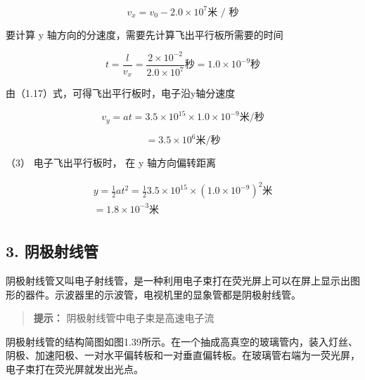 \[
v_{x} = v_{0} - 2.0 \times 10^{7} \text{米 / 秒}
\]

要计算 y 轴方向的分速度，需要先计算飞出平行板所需要的时间

\[
t = \frac{l}{v_{x}} = \frac{2 \times 10^{- 2}}{2.0 \times 10^{7}} \text{秒} = 1.0 \times 10^{- 9} \text{秒}
\]

由（1.17）式，可得飞出平行板时，电子沿y轴分速度

\[
v_{y} = a t = 3.5 \times 10^{15} \times 1.0 \times 10^{- 9} \text{米/秒}
\]

\[
= 3.5 \times 10^{6} \text{米/秒}
\]

（3） 电子飞出平行板时， 在 y 轴方向偏转距离

\[
\begin{array}{l} y = \frac{1}{2} a t^{2} = \frac{1}{2} 3.5 \times 10^{15} \times (1.0 \times 10^{- 9})^{2} \text{米} \\ = 1.8 \times 10^{- 3} \text{米} \\ \end{array}
\]

\subsection{3. 阴极射线管}\label{ux9634ux6781ux5c04ux7ebfux7ba1}

阴极射线管又叫电子射线管，是一种利用电子束打在荧光屏上可以在屏上显示出图形的器件。示波器里的示波管，电视机里的显象管都是阴极射线管。

\begin{quote}
\textbf{提示：} 阴极射线管中电子束是高速电子流
\end{quote}

阴极射线管的结构简图如图1.39所示。在一个抽成高真空的玻璃管内，装入灯丝、阴极、加速阳极、一对水平偏转板和一对垂直偏转板。在玻璃管右端为一荧光屏，电子束打在荧光屏就发出光点。

